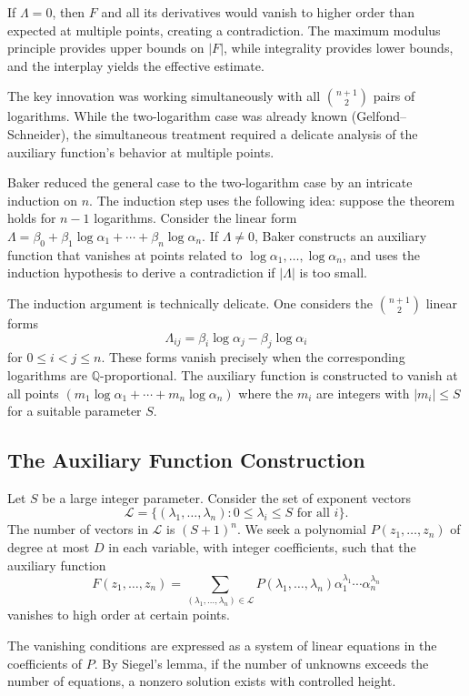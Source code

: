 If $\Lambda = 0$, then $F$ and all its derivatives would vanish to higher order than expected at multiple points, creating a contradiction. The maximum modulus principle provides upper bounds on $|F|$, while integrality provides lower bounds, and the interplay yields the effective estimate.

The key innovation was working simultaneously with all $\binom{n+1}{2}$ pairs of logarithms. While the two-logarithm case was already known (Gelfond--Schneider), the simultaneous treatment required a delicate analysis of the auxiliary function's behavior at multiple points.

Baker reduced the general case to the two-logarithm case by an intricate induction on $n$. The induction step uses the following idea: suppose the theorem holds for $n-1$ logarithms. Consider the linear form $\Lambda = \beta_0 + \beta_1 \log \alpha_1 + \cdots + \beta_n \log \alpha_n$. If $\Lambda \neq 0$, Baker constructs an auxiliary function that vanishes at points related to $\log \alpha_1, \ldots, \log \alpha_n$, and uses the induction hypothesis to derive a contradiction if $|\Lambda|$ is too small.

The induction argument is technically delicate. One considers the $\binom{n+1}{2}$ linear forms
\[
\Lambda_{ij} = \beta_i \log \alpha_j - \beta_j \log \alpha_i
\]
for $0 \leq i < j \leq n$. These forms vanish precisely when the corresponding logarithms are $\mathbb{Q}$-proportional. The auxiliary function is constructed to vanish at all points $(m_1 \log \alpha_1 + \cdots + m_n \log \alpha_n)$ where the $m_i$ are integers with $|m_i| \leq S$ for a suitable parameter $S$.

\subsection*{The Auxiliary Function Construction}

Let $S$ be a large integer parameter. Consider the set of exponent vectors
\[
\mathcal{L} = \{(\lambda_1, \ldots, \lambda_n) : 0 \leq \lambda_i \leq S \text{ for all } i\}.
\]
The number of vectors in $\mathcal{L}$ is $(S+1)^n$. We seek a polynomial $P(z_1, \ldots, z_n)$ of degree at most $D$ in each variable, with integer coefficients, such that the auxiliary function
\[
F(z_1, \ldots, z_n) = \sum_{(\lambda_1, \ldots, \lambda_n) \in \mathcal{L}} P(\lambda_1, \ldots, \lambda_n) \alpha_1^{\lambda_1} \cdots \alpha_n^{\lambda_n}
\]
vanishes to high order at certain points.

The vanishing conditions are expressed as a system of linear equations in the coefficients of $P$. By Siegel's lemma, if the number of unknowns exceeds the number of equations, a nonzero solution exists with controlled height.

